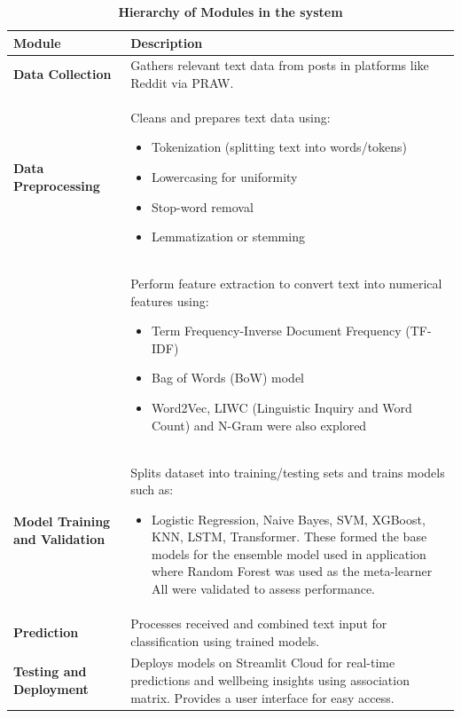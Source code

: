 \begin{table}[H]
    \centering
    \renewcommand{\arraystretch}{1.2} %
    \small %
    \begin{tabularx}{\textwidth}{|p{3.5cm}|X|}
        \hline
        \textbf{Module} & \textbf{Description} \\
        \hline
        \textbf{Data Collection} & Gathers relevant text data from posts in platforms like Reddit via PRAW. \\
        \hline
        \textbf{Data Preprocessing} & Cleans and prepares text data using:
        \begin{itemize}
            \setlength{\itemsep}{0pt}  %
            \setlength{\parskip}{0pt}
            \item Tokenization (splitting text into words/tokens)
            \item Lowercasing for uniformity
            \item Stop-word removal
            \item Lemmatization or stemming
        \end{itemize} \\
        \textbf{} & Perform feature extraction to convert text into numerical features using:
        \begin{itemize}
            \setlength{\itemsep}{0pt}  %
            \setlength{\parskip}{0pt}
            \item Term Frequency-Inverse Document Frequency (TF-IDF)
            \item Bag of Words (BoW) model
            \item Word2Vec, LIWC (Linguistic Inquiry and Word Count) and N-Gram were also explored
        \end{itemize} \\
        \hline
        \textbf{Model Training and Validation} & Splits dataset into training/testing sets and trains models such as:
        \setlength{\itemsep}{0pt}  %
        \setlength{\parskip}{0pt}
        \begin{itemize}
            \item Logistic Regression, Naive Bayes, SVM, XGBoost, KNN, LSTM, Transformer. These formed the base models for the ensemble model used in application where Random Forest was used as the meta-learner All were validated to assess performance.
        \end{itemize} \\
        \hline
        \textbf{Prediction} & Processes received and combined text input for classification using trained models. \\
        \hline
        \textbf{Testing and Deployment} & Deploys models on Streamlit Cloud for real-time predictions and wellbeing insights using association matrix. Provides a user interface for easy access. \\
        \hline
    \end{tabularx}
    \caption*{\textbf{Hierarchy of Modules in the system}}
    \label{tab:modules_hierarchy}
\end{table}


